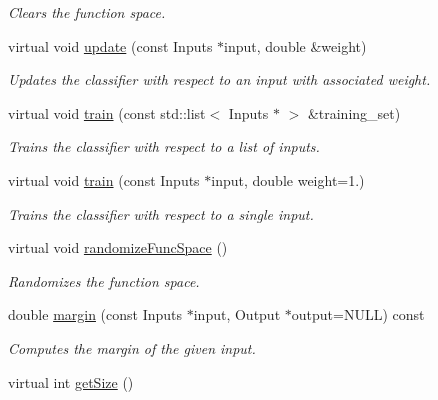\begin{DoxyCompactItemize}
\begin{DoxyCompactList}\small\item\em Clears the function space. \end{DoxyCompactList}\item 
virtual void \hyperlink{classiCub_1_1boostMIL_1_1OnlineSupport_a534fa475c6a1f492e05bd5cbcf858acb}{update} (const Inputs $\ast$input, double \&weight)
\begin{DoxyCompactList}\small\item\em Updates the classifier with respect to an input with associated weight. \end{DoxyCompactList}\item 
virtual void \hyperlink{classiCub_1_1boostMIL_1_1OnlineSupport_a48f59aae6859914aeacc2c5dbbbdddb6}{train} (const std\+::list$<$ Inputs $\ast$ $>$ \&training\+\_\+set)
\begin{DoxyCompactList}\small\item\em Trains the classifier with respect to a list of inputs. \end{DoxyCompactList}\item 
virtual void \hyperlink{classiCub_1_1boostMIL_1_1OnlineSupport_ad379db7256a11c82c8b8f9f6c6f9b0dc}{train} (const Inputs $\ast$input, double weight=1.)
\begin{DoxyCompactList}\small\item\em Trains the classifier with respect to a single input. \end{DoxyCompactList}\item 
virtual void \hyperlink{classiCub_1_1boostMIL_1_1OnlineSupport_a2ca04d7e2dd5e118b40b42951018fd15}{randomize\+Func\+Space} ()
\begin{DoxyCompactList}\small\item\em Randomizes the function space. \end{DoxyCompactList}\item 
double \hyperlink{classiCub_1_1boostMIL_1_1OnlineSupport_a9b6273a8d6a7d19816806a6072d233a4}{margin} (const Inputs $\ast$input, Output $\ast$output=N\+U\+L\+L) const 
\begin{DoxyCompactList}\small\item\em Computes the margin of the given input. \end{DoxyCompactList}\item 
virtual int \hyperlink{classiCub_1_1boostMIL_1_1StrongClassifier_a99285415c37a3f1271c8afb2b5e3ae94}{get\+Size} ()\label{classiCub_1_1boostMIL_1_1StrongClassifier_a99285415c37a3f1271c8afb2b5e3ae94}


\end{DoxyCompactItemize}

